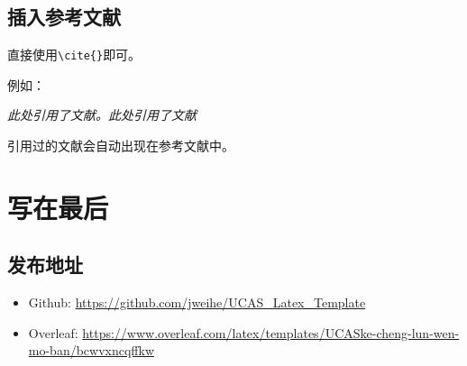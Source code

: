\documentclass[12pt,hyperref,a4paper,UTF8,fontset=fandol]{ctexart}
\begin{document}
%
%
%
%
%
%

\subsection{插入参考文献}
直接使用\verb|\cite{}|即可。

例如：


   \textit{ 此处引用了文献\cite{0Isaac}。此处引用了文献\cite{2016The}}


引用过的文献会自动出现在参考文献中。

\section{写在最后}
\subsection{发布地址}
\begin{itemize}
    \item Github: \url{https://github.com/jweihe/UCAS_Latex_Template}
    \item Overleaf:  \url{https://www.overleaf.com/latex/templates/UCASke-cheng-lun-wen-mo-ban/bcwvxncqffkw}
\end{itemize}


\end{document}
